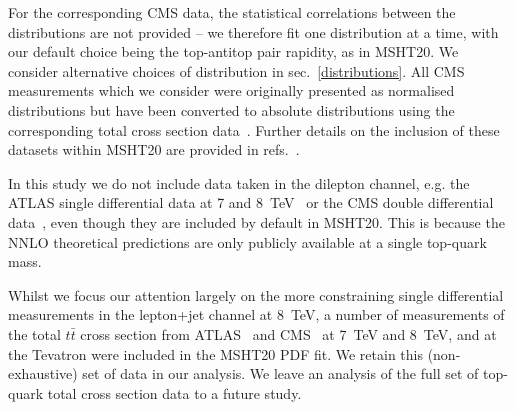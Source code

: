 \documentclass[sn-mathphys]{sn-jnl}%
\begin{document}
For the corresponding CMS data,  the statistical correlations between the distributions are not provided -- we therefore fit one distribution at a time, with our default choice being the top-antitop pair rapidity, as in MSHT20. We consider alternative choices of distribution in sec.~\ref{distributions}. All CMS measurements which we consider were originally presented as normalised distributions but have been converted to absolute distributions using the corresponding total cross section data~\cite{CMS:2016yys}. Further details on the inclusion of these datasets within MSHT20 are provided in refs.~\cite{Harland-Lang:2014zoa,Bailey:2019yze,Bailey:2020ooq}.

In this study we do not include data taken in the dilepton channel, e.g. the ATLAS single differential data at 7 and 8~TeV~\cite{ATLAS:2016pal} or the CMS double differential data~\cite{CMS:2017iqf}, even though they are included by default in MSHT20. This is because the NNLO theoretical predictions are only publicly available at a single top-quark mass. 

Whilst we focus our attention largely on the more constraining single differential measurements in the lepton+jet channel at 8~TeV, a number of measurements of the total $t\bar{t}$ cross section from ATLAS~\cite{ATLAS:2010zaw,ATLAS:2011whm,ATLAS:2012ptu,ATLAS:2012aa,ATLAS:2012xru,ATLAS:2012qtn,ATLAS:2015xtk} and CMS~\cite{CMS:2012ahl,CMS:2012exf,CMS:2012hcu,CMS:2013nie,CMS:2013yjt,CMS:2013hon,CMS:2014btv,CMS:2015auz} at 7~TeV and 8~TeV, and at the Tevatron \cite{CDF:2013hmv} were included in the MSHT20 PDF fit. We retain this (non-exhaustive) set of data in our analysis. We leave an analysis of the full set of top-quark total cross section data to a future study. 
\end{document}
